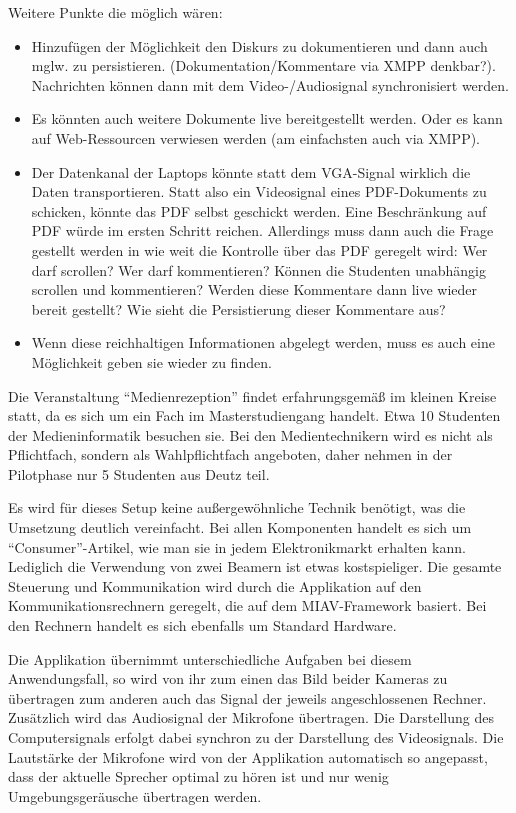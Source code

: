 Weitere Punkte die möglich wären:
\begin{itemize}

  \item Hinzufügen der Möglichkeit den Diskurs zu dokumentieren und dann auch mglw. zu persistieren. (Dokumentation/Kommentare via XMPP denkbar?). Nachrichten können dann mit dem Video-/Audiosignal synchronisiert werden.
  \item Es könnten auch weitere Dokumente live bereitgestellt werden. Oder es kann auf Web-Ressourcen verwiesen werden (am einfachsten auch via XMPP).
  \item Der Datenkanal der Laptops könnte statt dem VGA-Signal wirklich die Daten transportieren. Statt also ein Videosignal eines PDF-Dokuments zu schicken, könnte das PDF selbst geschickt werden. Eine Beschränkung auf PDF würde im ersten Schritt reichen. Allerdings muss dann auch die Frage gestellt werden in wie weit die Kontrolle über das PDF geregelt wird: Wer darf scrollen? Wer darf kommentieren? Können die Studenten unabhängig scrollen und kommentieren? Werden diese Kommentare dann live wieder bereit gestellt? Wie sieht die Persistierung dieser Kommentare aus?
  \item Wenn diese reichhaltigen Informationen abgelegt werden, muss es auch eine Möglichkeit geben sie wieder zu finden.

\end{itemize}

  Die Veranstaltung "`Medienrezeption"' findet erfahrungsgemäß im kleinen Kreise statt, da es sich um ein Fach im Masterstudiengang handelt. Etwa 10 Studenten der Medieninformatik besuchen sie. Bei den Medientechnikern wird es nicht als Pflichtfach, sondern als Wahlpflichtfach angeboten, daher nehmen in der Pilotphase nur 5 Studenten aus Deutz teil.

  Es wird für dieses Setup keine außergewöhnliche Technik benötigt, was die Umsetzung deutlich vereinfacht. Bei allen Komponenten handelt es sich um "`Consumer"'-Artikel, wie man sie in jedem Elektronikmarkt erhalten kann. Lediglich die Verwendung von zwei Beamern ist etwas kostspieliger. Die gesamte Steuerung und Kommunikation wird durch die Applikation auf den Kommunikationsrechnern geregelt, die auf dem MIAV-Framework basiert. Bei den Rechnern handelt es sich ebenfalls um Standard Hardware.

  Die Applikation übernimmt unterschiedliche Aufgaben bei diesem Anwendungsfall, so wird von ihr zum einen das Bild beider Kameras zu übertragen zum anderen auch das Signal der jeweils angeschlossenen Rechner. Zusätzlich wird das Audiosignal der Mikrofone übertragen. Die Darstellung des Computersignals erfolgt dabei synchron zu der Darstellung des Videosignals. Die Lautstärke der Mikrofone wird von der Applikation automatisch so angepasst, dass der aktuelle Sprecher optimal zu hören ist und nur wenig Umgebungsgeräusche übertragen werden.


